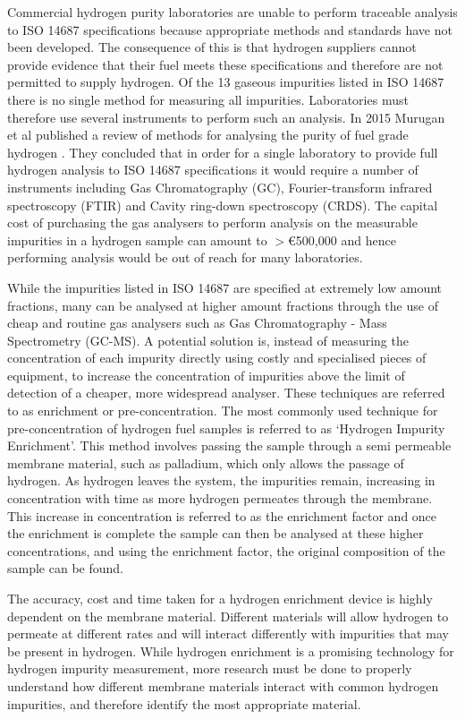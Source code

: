 Commercial hydrogen purity laboratories are unable to perform traceable analysis to ISO 14687 
specifications because appropriate methods and standards have not been developed. The consequence 
of this is that hydrogen suppliers cannot provide evidence that their fuel meets these specifications and therefore are not permitted to supply hydrogen. Of the 13 gaseous impurities listed in 
ISO 14687  there is no single method for measuring all impurities. Laboratories must therefore use 
several instruments to perform such an analysis.  In 2015 Murugan et al published a review of methods 
for analysing the purity of fuel grade hydrogen \cite{Murugan2015}. They concluded that in order for a single laboratory to provide full hydrogen analysis to ISO 14687 specifications it would require 
a number of instruments including Gas Chromatography (GC), Fourier-transform infrared spectroscopy (FTIR) and Cavity ring-down spectroscopy (CRDS). The capital cost of purchasing the gas 
analysers to perform analysis on the measurable impurities in a hydrogen sample can amount to 
$>$€500,000 \cite{Murugan2015} and hence performing analysis would be out of reach for many 
laboratories. 

While the impurities listed in ISO 14687 are specified at extremely low amount fractions, 
many can be analysed at higher amount fractions through the use of cheap and routine gas 
analysers such as Gas Chromatography - Mass Spectrometry (GC-MS). A potential solution is, instead of measuring the concentration of each impurity directly using costly and specialised pieces of equipment, to increase the concentration of impurities above the limit of detection of a cheaper, more widespread analyser. These techniques are referred 
to as enrichment or pre-concentration. The most commonly used technique for pre-concentration 
of hydrogen fuel samples is referred to as ‘Hydrogen Impurity Enrichment’. This method involves 
passing the sample through a semi permeable membrane material, such as palladium, which only allows the passage of hydrogen.\cite{NathanW.Ockwig2007a} As hydrogen leaves the system, the impurities remain, increasing in concentration with time as more hydrogen permeates through the membrane. This increase in concentration is referred to as the enrichment factor and once the enrichment is complete the sample can then be analysed at these higher concentrations, and using the enrichment factor, the original composition of the sample can be found. 

The accuracy, cost and time taken for a hydrogen enrichment device is highly dependent on the membrane material. Different materials will allow hydrogen to permeate at different rates and will interact differently with impurities that may be present in hydrogen.\cite{NathanW.Ockwig2007a} While hydrogen enrichment is a promising technology for hydrogen impurity measurement, more research must be done to properly understand how different membrane materials interact with common hydrogen impurities, and therefore identify the most appropriate material.

